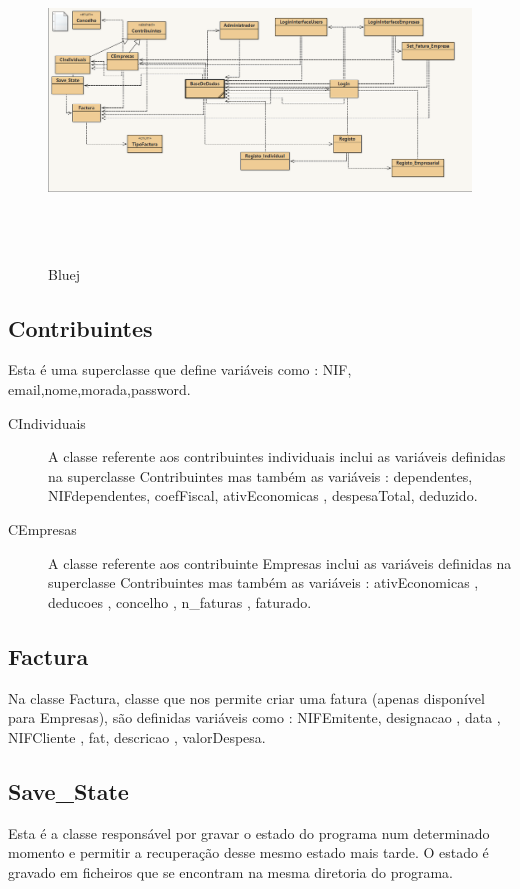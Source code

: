 \documentclass[a4paper]{article}
\begin{document}
\begin{figure}[H]
	\centering
	\includegraphics[width = 420pt,height = 240pt]{bluej.png}
	\caption{Bluej}
\end{figure}

\subsection{Contribuintes}
Esta é uma superclasse que define variáveis como : NIF, email,nome,morada,password.

\begin{description}
	\item[CIndividuais] A classe referente aos contribuintes individuais inclui as variáveis definidas na superclasse Contribuintes mas também as variáveis : dependentes, NIFdependentes, coefFiscal, ativEconomicas , despesaTotal, deduzido.

	\item[CEmpresas] A classe referente aos contribuinte Empresas 
	inclui as variáveis definidas na superclasse Contribuintes mas também as variáveis : ativEconomicas , deducoes , concelho , n_faturas , faturado.
\end{description}

\subsection{Factura}
Na classe Factura, classe que nos permite criar uma fatura (apenas disponível para Empresas), são definidas variáveis como : NIFEmitente, designacao , data , NIFCliente , fat, descricao , valorDespesa.

\subsection{Save_State}
Esta é a classe responsável por gravar o estado do programa num determinado momento e permitir a recuperação desse mesmo estado mais tarde. O estado é gravado em ficheiros que se encontram na mesma diretoria do programa.
\end{document}
